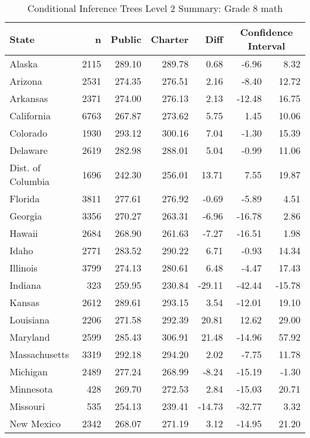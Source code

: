 \begin{table}[ht]
\begin{center}
\caption{Conditional Inference Trees Level 2 Summary: Grade 8 math}
\label{g8mathtreelevel2}
\begin{tabular}{lrrrrrr}
  \hline
  State & n & Public & Charter & Diff & \multicolumn{2}{c}{Confidence Interval} \\ \hline
Alaska & 2115 & 289.10 & 289.78 & 0.68 & -6.96 & 8.32 \\ 
  Arizona & 2531 & 274.35 & 276.51 & 2.16 & -8.40 & 12.72 \\ 
  Arkansas & 2371 & 274.00 & 276.13 & 2.13 & -12.48 & 16.75 \\ 
  California & 6763 & 267.87 & 273.62 & 5.75 & 1.45 & 10.06 \\ 
  Colorado & 1930 & 293.12 & 300.16 & 7.04 & -1.30 & 15.39 \\ 
  Delaware & 2619 & 282.98 & 288.01 & 5.04 & -0.99 & 11.06 \\ 
  Dist. of Columbia & 1696 & 242.30 & 256.01 & 13.71 & 7.55 & 19.87 \\ 
  Florida & 3811 & 277.61 & 276.92 & -0.69 & -5.89 & 4.51 \\ 
  Georgia & 3356 & 270.27 & 263.31 & -6.96 & -16.78 & 2.86 \\ 
  Hawaii & 2684 & 268.90 & 261.63 & -7.27 & -16.51 & 1.98 \\ 
  Idaho & 2771 & 283.52 & 290.22 & 6.71 & -0.93 & 14.34 \\ 
  Illinois & 3799 & 274.13 & 280.61 & 6.48 & -4.47 & 17.43 \\ 
  Indiana & 323 & 259.95 & 230.84 & -29.11 & -42.44 & -15.78 \\ 
  Kansas & 2612 & 289.61 & 293.15 & 3.54 & -12.01 & 19.10 \\ 
  Louisiana & 2206 & 271.58 & 292.39 & 20.81 & 12.62 & 29.00 \\ 
  Maryland & 2599 & 285.43 & 306.91 & 21.48 & -14.96 & 57.92 \\ 
  Massachusetts & 3319 & 292.18 & 294.20 & 2.02 & -7.75 & 11.78 \\ 
  Michigan & 2489 & 277.24 & 268.99 & -8.24 & -15.19 & -1.30 \\ 
  Minnesota & 428 & 269.70 & 272.53 & 2.84 & -15.03 & 20.71 \\ 
  Missouri & 535 & 254.13 & 239.41 & -14.73 & -32.77 & 3.32 \\ 
  New Mexico & 2342 & 268.07 & 271.19 & 3.12 & -14.95 & 21.20 \\ 

\end{tabular}
\end{center}
\end{table}
